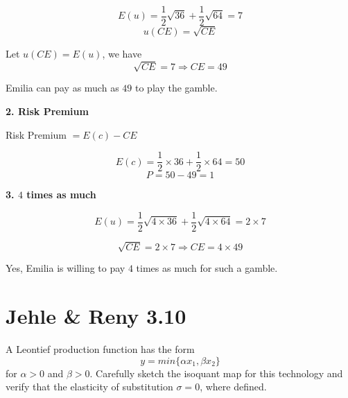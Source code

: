 \documentclass{article}
\begin{document}
$$E(u) = \frac{1}{2}\sqrt{36} +  \frac{1}{2}\sqrt{64} =7$$
$$u(CE) = \sqrt{CE}$$

Let $u(CE) = E(u)$, we have $$\sqrt{CE} = 7 \Rightarrow CE = 49$$

Emilia can pay as much as $49$ to play the gamble.

\vspace{4mm}

\textbf{2. Risk Premium}

 Risk Premium $= E(c) - CE$

 $$E(c)= \frac{1}{2} \times 36 + \frac{1}{2} \times 64 = 50$$
 $$P = 50 - 49 = 1$$

\textbf{3. $4$ times as much}

$$E(u) = \frac{1}{2}\sqrt{4 \times 36} +  \frac{1}{2}\sqrt{4 \times 64} =2 \times 7$$

$$\sqrt{CE} = 2 \times 7 \Rightarrow CE = 4 \times49$$

Yes, Emilia is willing to pay $4$ times as much for such a gamble.


\newpage

\section{Jehle \& Reny 3.10}

A Leontief production function has the form $$y = min\{\alpha x_1, \beta x_2 \}$$
for $\alpha > 0$ and $\beta > 0$. Carefully sketch the isoquant map for this technology and verify that the
elasticity of substitution $\sigma = 0$, where defined.
\end{document}
